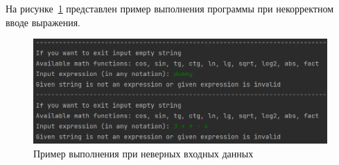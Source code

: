 На рисунке~\ref{fig:ex_errors} представлен
пример выполнения программы при некорректном вводе
выражения.

\begin{figure}[H]
    \centering
    \includegraphics[width=\linewidth]{photo/ex_errors}
    \caption{Пример выполнения при неверных входных данных}
    \label{fig:ex_errors}
\end{figure}